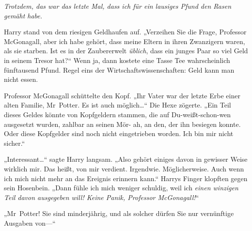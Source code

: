 \emph{Trotzdem, das war das letzte Mal, dass ich für ein lausiges Pfund den Rasen gemäht habe.}

Harry stand von dem riesigen Geldhaufen auf. „Verzeihen Sie die Frage, Professor McGonagall, aber ich habe gehört, dass meine Eltern in ihren Zwanzigern waren, als sie starben. Ist es in der Zaubererwelt \emph{üblich}, dass ein junges Paar so viel Geld in seinem Tresor hat?“ Wenn ja, dann kostete eine Tasse Tee wahrscheinlich fünftausend Pfund. Regel eins der Wirtschaftswissenschaften: Geld kann man nicht essen.

Professor McGonagall schüttelte den Kopf. „Ihr Vater war der letzte Erbe einer alten Familie, Mr~Potter. Es ist auch möglich…“ Die Hexe zögerte. „Ein Teil dieses Geldes könnte von Kopfgeldern stammen, die auf Du-weißt-schon-wen ausgesetzt wurden, zahlbar an seinen Mör- ah, an den, der ihn besiegen konnte. Oder diese Kopfgelder sind noch nicht eingetrieben worden. Ich bin mir nicht sicher.“

„Interessant…“ sagte Harry langsam. „Also gehört einiges davon in gewisser Weise wirklich mir. Das heißt, von mir verdient. Irgendwie. Möglicherweise. Auch wenn ich mich nicht mehr an das Ereignis erinnern kann.“ Harrys Finger klopften gegen sein Hosenbein. „Dann fühle ich mich weniger schuldig, weil ich \emph{einen winzigen Teil davon ausgegeben will! Keine Panik, Professor McGonagall!}“

„Mr~Potter! Sie sind minderjährig, und als solcher dürfen Sie nur vernünftige Ausgaben von—“

